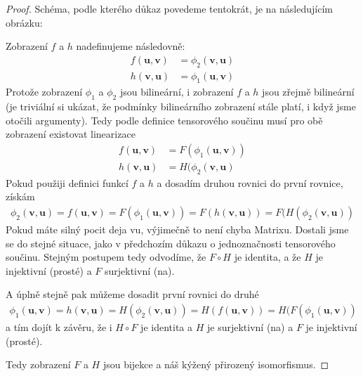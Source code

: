 \documentclass[a5paper,12pt]{amsbook}
\theoremstyle{definition}
\newcommand{\myvec}[1]{\mathbf{#1}}
\begin{document}
\begin{proof}
Schéma, podle kterého důkaz povedeme tentokrát, je na následujícím obrázku:
\begin{center}

\end{center}
Zobrazení $f$ a $h$ nadefinujeme následovně:
\begin{equation*}
\begin{split}
f(\myvec{u}, \myvec{v}) &= \phi_2(\myvec{v}, \myvec{u}) \\
h(\myvec{v}, \myvec{u}) &= \phi_1(\myvec{u}, \myvec{v})
\end{split}
\end{equation*}
Protože zobrazení $\phi_1$ a $\phi_2$ jsou bilineární, i zobrazení $f$ a $h$ jsou zřejmě
bilineární (je triviální si ukázat, že podmínky bilineárního zobrazení stále platí, i když
jsme otočili argumenty). Tedy podle definice tensorového součinu musí pro obě zobrazení
existovat linearizace
\begin{equation*}
\begin{split}
f(\myvec{u}, \myvec{v}) &= F(\phi_1(\myvec{u}, \myvec{v})) \\
h(\myvec{v}, \myvec{u}) &= H(\phi_2(\myvec{v}, \myvec{u})
\end{split}
\end{equation*}
Pokud použiji definici funkcí $f$ a $h$ a dosadím druhou rovnici do první rovnice, získám
\begin{equation*}
\begin{split}
\phi_2(\myvec{v}, \myvec{u}) = f(\myvec{u}, \myvec{v}) = F(\phi_1(\myvec{u}, \myvec{v})) 
  = F(h(\myvec{v}, \myvec{u})) = F(H(\phi_2(\myvec{v}, \myvec{u}))
\end{split}
\end{equation*}
Pokud máte silný pocit deja vu, výjimečně to není chyba Matrixu. Dostali jsme se do stejné
situace, jako v předchozím důkazu o jednoznačnosti tensorového součinu. Stejným postupem
tedy odvodíme, že $F \circ H$ je identita, a že $H$ je injektivní (prosté) a $F$ surjektivní
(na).

A úplně stejně pak můžeme dosadit první rovnici do druhé
\begin{equation*}
\begin{split}
\phi_1(\myvec{u}, \myvec{v}) = h(\myvec{v}, \myvec{u}) = H(\phi_2(\myvec{v}, \myvec{u}))
  = H(f(\myvec{u}, \myvec{v})) = H(F(\phi_1(\myvec{u}, \myvec{v}))
\end{split}
\end{equation*}
a tím dojít k závěru, že i $H \circ F$ je identita a $H$ je surjektivní (na) a $F$ je
injektivní (prosté).

Tedy zobrazení $F$ a $H$ jsou bijekce a náš kýžený přirozený isomorfismus.
\end{proof}
\end{document}
